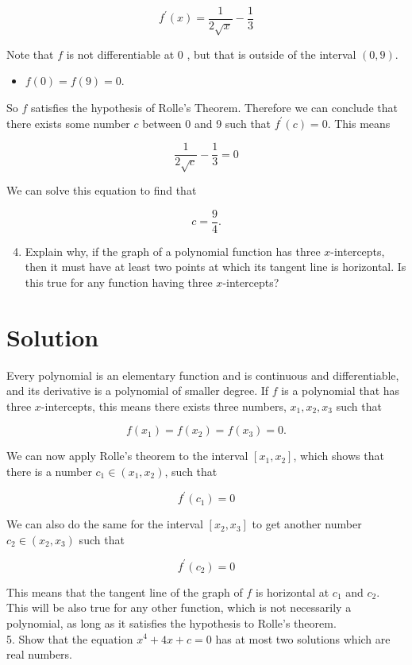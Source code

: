 \documentclass[10pt]{article}
\begin{document}
$$
f^{\prime}(x)=\frac{1}{2 \sqrt{x}}-\frac{1}{3}
$$

Note that $f$ is not differentiable at 0 , but that is outside of the interval $(0,9)$.

\begin{itemize}
  \item $f(0)=f(9)=0$.
\end{itemize}

So $f$ satisfies the hypothesis of Rolle's Theorem. Therefore we can conclude that there exists some number $c$ between 0 and 9 such that $f^{\prime}(c)=0$. This means

$$
\frac{1}{2 \sqrt{c}}-\frac{1}{3}=0
$$

We can solve this equation to find that

$$
c=\frac{9}{4} .
$$

\begin{enumerate}
  \setcounter{enumi}{3}
  \item Explain why, if the graph of a polynomial function has three $x$-intercepts, then it must have at least two points at which its tangent line is horizontal. Is this true for any function having three $x$-intercepts?
\end{enumerate}

\section*{Solution}
Every polynomial is an elementary function and is continuous and differentiable, and its derivative is a polynomial of smaller degree. If $f$ is a polynomial that has three $x$-intercepts, this means there exists three numbers, $x_{1}, x_{2}, x_{3}$ such that

$$
f\left(x_{1}\right)=f\left(x_{2}\right)=f\left(x_{3}\right)=0 .
$$

We can now apply Rolle's theorem to the interval $\left[x_{1}, x_{2}\right]$, which shows that there is a number $c_{1} \in\left(x_{1}, x_{2}\right)$, such that

$$
f^{\prime}\left(c_{1}\right)=0
$$

We can also do the same for the interval $\left[x_{2}, x_{3}\right]$ to get another number $c_{2} \in\left(x_{2}, x_{3}\right)$ such that

$$
f^{\prime}\left(c_{2}\right)=0
$$

This means that the tangent line of the graph of $f$ is horizontal at $c_{1}$ and $c_{2}$.\\
This will be also true for any other function, which is not necessarily a polynomial, as long as it satisfies the hypothesis to Rolle's theorem.\\
5. Show that the equation $x^{4}+4 x+c=0$ has at most two solutions which are real numbers.
\end{document}
